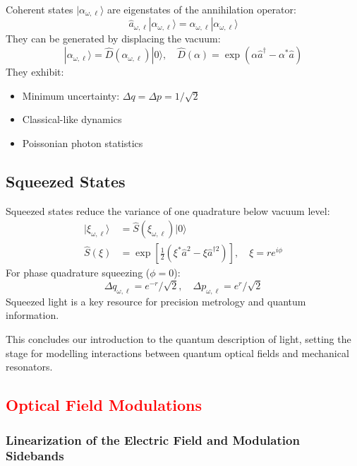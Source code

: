 Coherent states $|\alpha_{\omega,\ell}\rangle$ are eigenstates of the annihilation operator:
\begin{equation}
\hat{a}_{\omega,\ell}|\alpha_{\omega,\ell}\rangle = \alpha_{\omega,\ell}|\alpha_{\omega,\ell}\rangle
\end{equation}
They can be generated by displacing the vacuum:
\begin{equation}
|\alpha_{\omega,\ell}\rangle = \hat{D}(\alpha_{\omega,\ell})|0\rangle, \quad \hat{D}(\alpha) = \exp(\alpha \hat{a}^\dagger - \alpha^* \hat{a})
\end{equation}
They exhibit:
\begin{itemize}
  \item Minimum uncertainty: $\Delta q = \Delta p = 1/\sqrt{2}$
  \item Classical-like dynamics
  \item Poissonian photon statistics
\end{itemize}

\subsection*{Squeezed States}

Squeezed states reduce the variance of one quadrature below vacuum level:
\begin{align}
|\xi_{\omega,\ell}\rangle &= \hat{S}(\xi_{\omega,\ell}) |0\rangle \\
\hat{S}(\xi) &= \exp\left[\frac{1}{2}(\xi^* \hat{a}^2 - \xi \hat{a}^{\dagger 2})\right], \quad \xi = r e^{i\phi}
\end{align}
For phase quadrature squeezing ($\phi = 0$):
\begin{equation}
\Delta q_{\omega,\ell} = e^{-r}/\sqrt{2}, \quad \Delta p_{\omega,\ell} = e^{r}/\sqrt{2}
\end{equation}
Squeezed light is a key resource for precision metrology and quantum information.


\vspace{1em}
This concludes our introduction to the quantum description of light, setting the stage for modelling interactions between quantum optical fields and mechanical resonators.

\subsection{\textcolor{red}{Optical Field Modulations}}
\subsubsection*{Linearization of the Electric Field and Modulation Sidebands}

